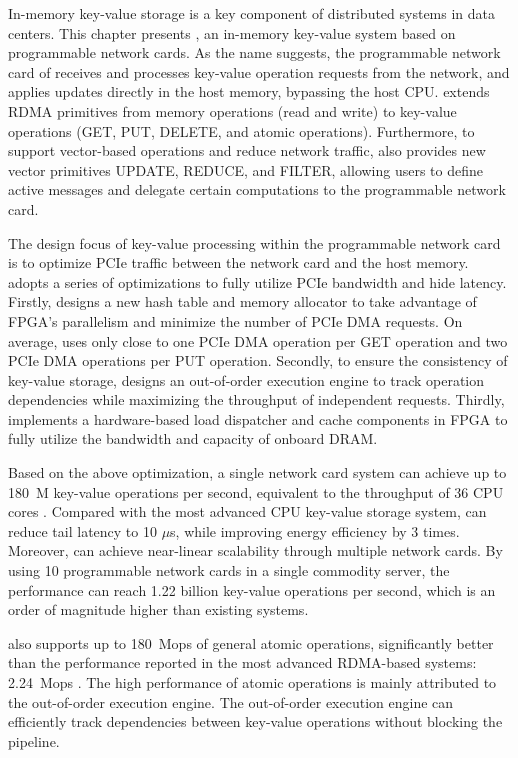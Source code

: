In-memory key-value storage is a key component of distributed systems in data centers. This chapter presents \oursys{}, an in-memory key-value system based on programmable network cards. As the name suggests, the programmable network card of \oursys{} receives and processes key-value operation requests from the network, and applies updates directly in the host memory, bypassing the host CPU. \oursys{} extends RDMA primitives from memory operations (read and write) to key-value operations (GET, PUT, DELETE, and atomic operations). Furthermore, to support vector-based operations and reduce network traffic, \oursys{} also provides new vector primitives UPDATE, REDUCE, and FILTER, allowing users to define active messages \cite {eicken1992active} and delegate certain computations to the programmable network card.

The design focus of key-value processing within the programmable network card is to optimize PCIe traffic between the network card and the host memory. \oursys{} adopts a series of optimizations to fully utilize PCIe bandwidth and hide latency. Firstly, \oursys{} designs a new hash table and memory allocator to take advantage of FPGA's parallelism and minimize the number of PCIe DMA requests. On average, \oursys{} uses only close to one PCIe DMA operation per GET operation and two PCIe DMA operations per PUT operation. Secondly, to ensure the consistency of key-value storage, \oursys{} designs an out-of-order execution engine to track operation dependencies while maximizing the throughput of independent requests. Thirdly, \oursys{} implements a hardware-based load dispatcher and cache components in FPGA to fully utilize the bandwidth and capacity of onboard DRAM.

Based on the above optimization, a single network card \oursys{} system can achieve up to 180~M key-value operations per second, equivalent to the throughput of 36 CPU cores \cite {li2016full}.
Compared with the most advanced CPU key-value storage system, \oursys{} can reduce tail latency to 10 $\mu$s, while improving energy efficiency by 3 times.
Moreover, \oursys{} can achieve near-linear scalability through multiple network cards. By using 10 programmable network cards in a single commodity server, the performance can reach 1.22 billion key-value operations per second, which is an order of magnitude higher than existing systems.

\oursys{} also supports up to 180~Mops of general atomic operations, significantly better than the performance reported in the most advanced RDMA-based systems: 2.24~Mops \cite {kalia2014using}. The high performance of atomic operations is mainly attributed to the out-of-order execution engine. The out-of-order execution engine can efficiently track dependencies between key-value operations without blocking the pipeline.

